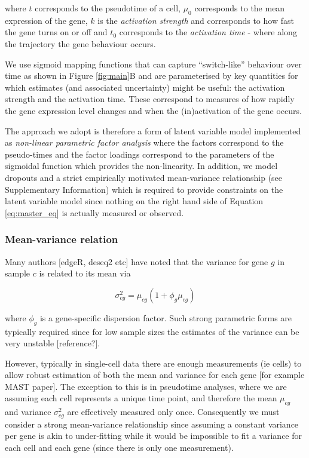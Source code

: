 where $t$ corresponds to the pseudotime of a cell, $\mu_0$ corresponds to the mean expression of the gene, $k$ is the \emph{activation strength} and corresponds to how fast the  gene turns on or off and $t_0$ corresponds to the \emph{activation time} - where along the trajectory the gene behaviour occurs.

We use sigmoid mapping functions that can capture ``switch-like'' behaviour over time as shown in Figure \ref{fig:main}B and are parameterised by key quantities for which estimates (and associated uncertainty) might be useful: the activation strength and the activation time. These correspond to measures of how rapidly the gene expression level changes and when the (in)activation of the gene occurs.

The approach we adopt is therefore a form of latent variable model implemented as \emph{non-linear parametric factor analysis} where the factors correspond to the pseudo-times and the factor loadings correspond to the parameters of the sigmoidal function which provides the non-linearity. In addition, we model dropouts and a strict empirically motivated mean-variance relationship (see Supplementary Information) which is required to provide constraints on the latent variable model since nothing on the right hand side of Equation \ref{eq:master_eq} is actually measured or observed.


\subsubsection{Mean-variance relation}

\noindent{}
\;

Many authors [edgeR, deseq2 etc] have noted that the variance for gene $g$ in sample $c$ is related to its mean via

\begin{equation} \label{eq:overd}
\sigma_{cg}^2 = \mu_{cg}(1 + \phi_g \mu_{cg})
\end{equation}

where $\phi_g$ is a gene-specific dispersion factor. Such strong parametric forms are typically required since for low sample sizes the estimates of the variance can be very unstable [reference?].

However, typically in single-cell data there are enough measurements (ie cells) to allow robust estimation of both the mean and variance for each gene [for example MAST paper]. The exception to this is in pseudotime analyses, where we are assuming each cell represents a unique time point, and therefore the mean $\mu_{cg}$ and variance $\sigma^2_{cg}$ are effectively measured only once. Consequently we must consider a strong mean-variance relationship since assuming a constant variance per gene is akin to under-fitting while it would be impossible to fit a variance for each cell and each gene (since there is only one measurement).

